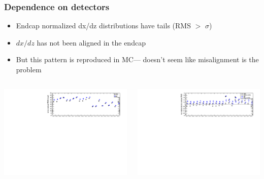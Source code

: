 \documentclass[compress]{beamer}
\begin{document}
\begin{frame}
\frametitle{Dependence on detectors}

\begin{itemize}
\item Endcap normalized dx/dz distributions have tails (RMS $>$ $\sigma$)
\item $dx/dz$ has not been aligned in the endcap
\item But this pattern is reproduced in MC--- doesn't seem like misalignment is the problem
\end{itemize}
\begin{columns}
\includegraphics[width=\linewidth]{summarydXdZ.pdf}

\includegraphics[width=\linewidth]{summarydXdZnorm.pdf}


\end{columns}
\end{frame}
\end{document}
